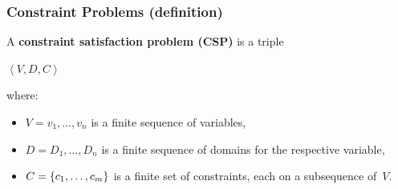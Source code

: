 \documentclass{beamer}
\begin{document}
\begin{frame}
  \frametitle{Constraint Problems (definition)}
  \begin{definition}
    A \textbf{constraint satisfaction problem (CSP)} is a 
    triple\\
    \begin{center}
      $\left<V,D,C\right>$\\      
    \end{center}
    where: \\
    \begin{itemize}
      \item $V = v_1, \ldots, v_n$ is a finite sequence of variables,
      \item $D = D_1, \ldots, D_n$ is a finite sequence of domains for the respective variable,
      \item $C = \left\{c_1, \ldots, c_m\right\}$ is a finite set of constraints, 
        each on a subsequence of~$V$.
    \end{itemize}
  \end{definition}
\end{frame}
\end{document}
